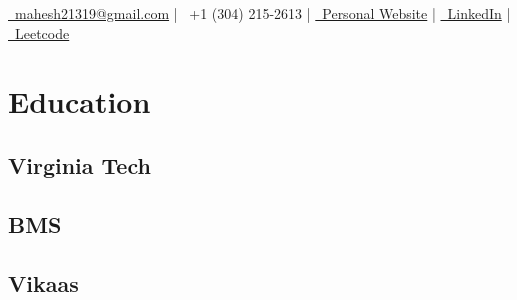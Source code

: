 \documentclass[]{resume-openfont}
\begin{document}
%
%
\lastupdated

%
%
{ 
\href{mailto:mahesh21319@gmail.com}{\faEnvelope \, mahesh21319@gmail.com} |
\faPhone \, +1 (304) 215-2613 |
\href{https://mahesh-maddhuru.github.io/}{\faUserTie \, Personal Website} |
\href{http://www.linkedin.com/in/mahesh-m97}{\faLinkedin \, LinkedIn} |
\href{https://leetcode.com/mahm/}{\faCode \, Leetcode}
}

%
%

\begin{minipage}[t]{0.33\textwidth} 


\section{Education} 

\subsection{Virginia Tech}
\sectionsep

\subsection{BMS}
\sectionsep

\subsection{Vikaas}
\sectionsep




\end{minipage}
\end{document}
